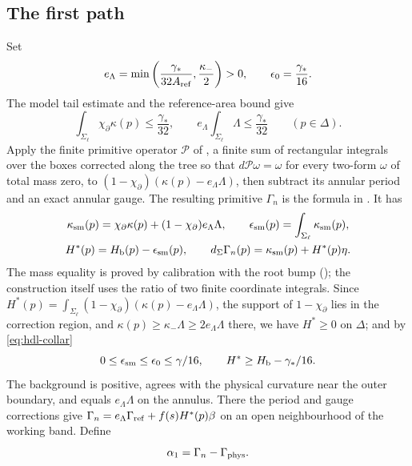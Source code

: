\subsection{The first path}\label{sec:hdl-first}

Set
\begin{equation}\label{eq:hdl-eh}
 e_\Lambda=\min\left(\frac{\gamma_*}{32A_{\rm ref}},\frac{\kappa_-}{2}\right)>0,
 \qquad \epsilon_0=\frac{\gamma_*}{16}.
\end{equation}
The model tail estimate and the reference-area bound give
\begin{equation}\label{eq:hdl-collar}
 \int_{\Sigma_\ell}\chi_\partial\kappa(p)\le\frac{\gamma_*}{32},\qquad
 e_\Lambda\int_{\Sigma_\ell}\Lambda\le\frac{\gamma_*}{32}\qquad(p\in\Delta).
\end{equation}
Apply the finite primitive operator $\mathcal P$ of , a finite sum of rectangular integrals over the boxes corrected along the tree so that $d\mathcal P\omega=\omega$ for every two-form $\omega$ of total mass zero, to
$(1-\chi_\partial)(\kappa(p)-e_\Lambda\Lambda)$, then subtract its annular period and an exact annular gauge.
The resulting primitive $\Gamma_n$ is the formula in .
It has
\begin{equation}\label{eq:hdl-ksm}
\begin{gathered}
 \kappa_{\rm sm}(p)=\chi_\partial\kappa(p)+(1-\chi_\partial)e_\Lambda\Lambda,\qquad
 \epsilon_{\rm sm}(p)=\int_{\Sigma_\ell}\kappa_{\rm sm}(p),\\
 H^*(p)=H_{\mathrm b}(p)-\epsilon_{\rm sm}(p),\qquad
 d_\Sigma\Gamma_n(p)=\kappa_{\rm sm}(p)+H^*(p)\eta .
\end{gathered}
\end{equation}
The mass equality is proved by calibration with the root bump (); the
construction itself uses the ratio of two finite coordinate integrals. Since
$H^*(p)=\int_{\Sigma_\ell}(1-\chi_\partial)(\kappa(p)-e_\Lambda\Lambda)$, the support of $1-\chi_\partial$ lies in
the correction region, and $\kappa(p)\ge\kappa_-\Lambda\ge2e_\Lambda\Lambda$ there, we have $H^*\ge0$ on $\Delta$;
and by \eqref{eq:hdl-collar}
\begin{equation}\label{eq:hdl-budget}
 0\le\epsilon_{\rm sm}\le\epsilon_0\le\gamma/16,\qquad
 H^*\ge H_{\mathrm b}-\gamma_*/16.
\end{equation}
The background is positive, agrees with the physical curvature near the outer boundary, and equals
$e_\Lambda\Lambda$ on the annulus. There the period and gauge corrections give
$\Gamma_n=e_\Lambda\Gamma_{\rm ref}+f(s)H^*(p)\beta$ on an open neighbourhood of the working band.
Define
\begin{equation}\label{eq:hdl-alpha1}
 \alpha_1=\Gamma_n-\Gamma_{\rm phys}.
\end{equation}

